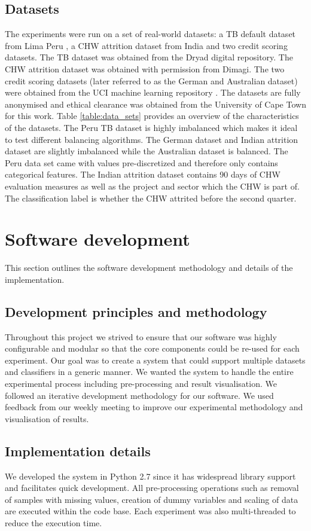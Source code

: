 \documentclass{sig-alternate-05-2015}
\begin{document}
	\subsection{Datasets}
	The experiments were run on a set of real-world datasets: a TB default dataset from Lima Peru \cite{Lackey:10356751520150601}, a CHW attrition dataset from India and two credit scoring datasets. The TB dataset was obtained from the Dryad digital repository. The CHW attrition dataset was obtained with permission from Dimagi. The two credit scoring datasets (later referred to as the German and Australian dataset) were obtained from the UCI machine learning repository \cite{Lichman:2013}. The datasets are fully anonymised and ethical clearance was obtained from the University of Cape Town for this work. Table \ref{table:data_sets} provides an overview of the characteristics of the datasets. The Peru TB dataset is highly imbalanced which makes it ideal to test different balancing algorithms. The German dataset and Indian attrition dataset are slightly imbalanced while the Australian dataset is balanced. The Peru data set came with values pre-discretized and therefore only contains categorical features. The Indian attrition dataset contains 90 days of CHW evaluation measures as well as the project and sector which the CHW is part of. The classification label is whether the CHW attrited before the second quarter.
		
	\section{Software development}
	This section outlines the software development methodology and details of the implementation.
	\subsection{Development principles and methodology}
	Throughout this project we strived to ensure that our software was highly configurable and modular so that the core components could be re-used for each experiment. Our goal was to create a system that could support multiple datasets and classifiers in a generic manner. We wanted the system to handle the entire experimental process including pre-processing and result visualisation. We followed an iterative development methodology for our software. We used feedback from our weekly meeting to improve our experimental methodology and visualisation of results.
	
	\subsection{Implementation details}
	We developed the system in Python 2.7 since it has widespread library support and facilitates quick development. All pre-processing operations such as removal of samples with missing values, creation of dummy variables and scaling of data are executed within the code base. Each experiment was also multi-threaded to reduce the execution time.
	
\end{document}
